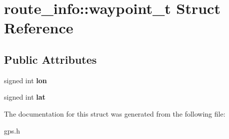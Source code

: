 \hypertarget{structroute__info_1_1waypoint__t}{\section{route\-\_\-info\-:\-:waypoint\-\_\-t \-Struct \-Reference}
\label{structroute__info_1_1waypoint__t}
}
\subsection*{\-Public \-Attributes}
\begin{DoxyCompactItemize}
\item 
\hypertarget{structroute__info_1_1waypoint__t_a310c6901ca3d57049c71407a2f62733d}{signed int {\bfseries lon}}\label{structroute__info_1_1waypoint__t_a310c6901ca3d57049c71407a2f62733d}

\item 
\hypertarget{structroute__info_1_1waypoint__t_af609eed8eaff44b08bf634c44f980bc2}{signed int {\bfseries lat}}\label{structroute__info_1_1waypoint__t_af609eed8eaff44b08bf634c44f980bc2}

\end{DoxyCompactItemize}


\-The documentation for this struct was generated from the following file\-:\begin{DoxyCompactItemize}
\item 
gps.\-h\end{DoxyCompactItemize}
